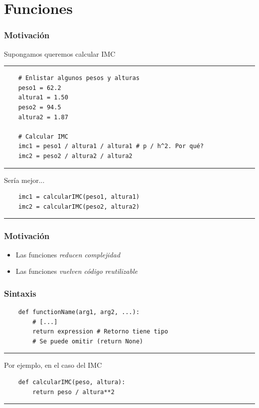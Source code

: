 \documentclass[14pt,aspectratio=169,xcolor=dvipsnames]{beamer}
\begin{document}
\section{Funciones}
\begin{frame}[fragile]\frametitle{Motivación}
Supongamos queremos calcular IMC

\rule{\textwidth}{1pt}
\scriptsize
\begin{verbatim}
    # Enlistar algunos pesos y alturas
    peso1 = 62.2
    altura1 = 1.50
    peso2 = 94.5
    altura2 = 1.87
    
    # Calcular IMC
    imc1 = peso1 / altura1 / altura1 # p / h^2. Por qué?
    imc2 = peso2 / altura2 / altura2
\end{verbatim}
\rule{\textwidth}{1pt}
\pause Sería mejor... 
\begin{verbatim}
    imc1 = calcularIMC(peso1, altura1)
    imc2 = calcularIMC(peso2, altura2)
\end{verbatim}
\rule{\textwidth}{1pt}

\end{frame}
\begin{frame}\frametitle{Motivación}
    \begin{itemize}
        \item Las funciones \emph{reducen complejidad}
        \item Las funciones \emph{vuelven código reutilizable}
    \end{itemize}
\end{frame}
\begin{frame}[fragile]\frametitle{Sintaxis}

\begin{verbatim}
    def functionName(arg1, arg2, ...):
        # [...]
        return expression # Retorno tiene tipo 
        # Se puede omitir (return None)
\end{verbatim}
\rule{\textwidth}{1pt}
Por ejemplo, en el caso del IMC
\begin{verbatim}
    def calcularIMC(peso, altura):
        return peso / altura**2
\end{verbatim}
\rule{\textwidth}{1pt}
\end{frame}
\end{document}
